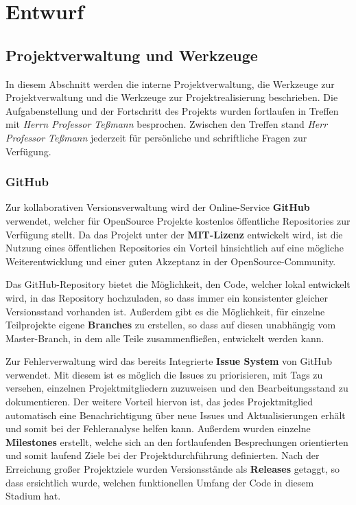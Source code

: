 \chapter{Entwurf}
\section{Projektverwaltung und Werkzeuge}
In diesem Abschnitt werden die interne Projektverwaltung, die Werkzeuge zur Projektverwaltung und die Werkzeuge zur Projektrealisierung beschrieben.
Die Aufgabenstellung und der Fortschritt des Projekts wurden fortlaufen in Treffen mit \textit{Herrn Professor Teßmann} besprochen. Zwischen den Treffen stand \textit{Herr Professor Teßmann} jederzeit für persönliche und schriftliche Fragen zur Verfügung.

\subsection{GitHub}
Zur kollaborativen Versionsverwaltung wird der Online-Service \textbf{GitHub} \cite{GitHub} verwendet, welcher für OpenSource Projekte kostenlos öffentliche Repositories zur Verfügung stellt. Da das Projekt unter der \textbf{MIT-Lizenz} entwickelt wird, ist die Nutzung eines öffentlichen Repositories ein Vorteil hinsichtlich auf eine mögliche Weiterentwicklung und einer guten Akzeptanz in der OpenSource-Community.

Das GitHub-Repository bietet die Möglichkeit, den Code, welcher lokal entwickelt wird, in das Repository hochzuladen, so dass immer ein konsistenter gleicher Versionsstand vorhanden ist. Außerdem gibt es die Möglichkeit, für einzelne Teilprojekte eigene \textbf{Branches} zu erstellen, so dass auf diesen unabhängig vom Master-Branch, in dem alle Teile zusammenfließen, entwickelt werden kann.

Zur Fehlerverwaltung wird das bereits Integrierte \textbf{Issue System} von GitHub verwendet. Mit diesem ist es möglich die Issues zu priorisieren, mit Tags zu versehen, einzelnen Projektmitgliedern zuzuweisen und den Bearbeitungsstand zu dokumentieren. Der weitere Vorteil hiervon ist, das jedes Projektmitglied automatisch eine Benachrichtigung über neue Issues und Aktualisierungen erhält und somit bei der Fehleranalyse helfen kann.
Außerdem wurden einzelne \textbf{Milestones} erstellt, welche sich an den fortlaufenden Besprechungen orientierten und somit laufend Ziele bei der Projektdurchführung definierten. Nach der Erreichung großer Projektziele wurden Versionsstände als \textbf{Releases} getaggt, so dass ersichtlich wurde, welchen funktionellen Umfang der Code in diesem Stadium hat.


